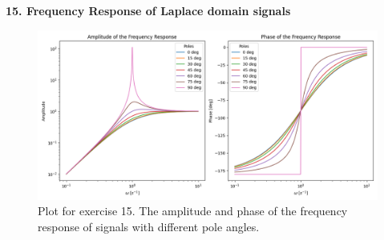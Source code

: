 \newpage
\textbf{\large 15. Frequency Response of Laplace domain signals}
\\



\begin{figure}[H]
	\centering
	\includegraphics[width=16cm]{img/ex_15.png}
	\captionsetup{width=14cm}
	\caption{Plot for exercise 15. The amplitude and phase of the frequency response of signals with different pole angles.}
\end{figure}
